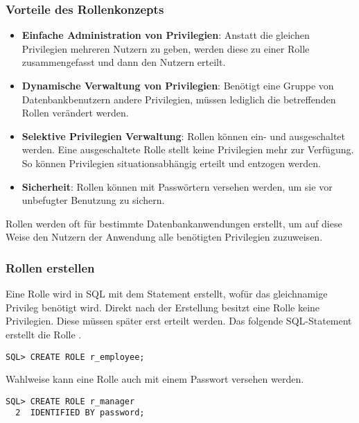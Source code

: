         \subsubsection{Vorteile des Rollenkonzepts}
          \begin{itemize}
            \item \textbf{Einfache Administration von Privilegien}: Anstatt die gleichen Privilegien mehreren Nutzern zu geben, werden diese zu einer Rolle zusammengefasst und dann den Nutzern erteilt.
            \item \textbf{Dynamische Verwaltung von Privilegien}: Ben\"otigt eine Gruppe von Datenbankbenutzern andere Privilegien, m\"ussen lediglich die betreffenden Rollen ver\"an\-dert werden.
            \item \textbf{Selektive Privilegien Verwaltung}: Rollen k\"onnen ein- und ausgeschaltet werden. Eine ausgeschaltete Rolle stellt keine Privilegien mehr zur Verf\"ugung. So k\"onnen Privilegien situationsabh\"angig erteilt und entzogen werden.
            \item \textbf{Sicherheit}: Rollen k\"onnen mit Passw\"ortern versehen werden, um sie vor unbefugter Benutzung zu sichern.
          \end{itemize}
          Rollen werden oft f\"ur bestimmte Datenbankanwendungen erstellt, um
          auf diese Weise den Nutzern der Anwendung alle ben\"otigten
          Privilegien zuzuweisen.
\clearpage
          \vspace{\baselineskip}
        \subsubsection{Rollen erstellen}
          Eine Rolle wird in SQL mit dem Statement  erstellt, wof\"ur das gleichnamige Privileg  ben\"otigt wird. Direkt nach der Erstellung besitzt eine Rolle keine Privilegien. Diese m\"ussen sp\"ater erst erteilt werden. Das folgende SQL-Statement erstellt die Rolle .
          \begin{lstlisting}[caption={Erstellen einer Rolle},label=admin247,language=oracle_sql]
SQL> CREATE ROLE r_employee;
          \end{lstlisting}
          Wahlweise kann eine Rolle auch mit einem Passwort versehen werden.
          \begin{lstlisting}[caption={Erstellen einer Rolle mit Passwort},label=admin248,language=oracle_sql]
SQL> CREATE ROLE r_manager
  2  IDENTIFIED BY password;
          \end{lstlisting}
